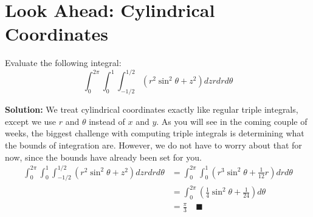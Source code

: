 \documentclass[letterpaper, 11pt]{article}
\begin{document}
\section{Look Ahead: Cylindrical Coordinates}
Evaluate the following integral:
\[ \int_0^{2 \pi} \int_0^1 \int_{-1/2}^{1/2} (r^2 \sin^2 \theta + z^2) dz r dr d\theta \]
\par \textbf{Solution:} We treat cylindrical coordinates exactly like regular triple integrals, except we use $r$ and $\theta$ instead of $x$ and $y$. As you will see in the coming couple of weeks, the biggest challenge with computing triple integrals is determining what the bounds of integration are. However, we do not have to worry about that for now, since the bounds have already been set for you.
\begin{align*}
\int_0^{2 \pi} \int_0^1 \int_{-1/2}^{1/2} (r^2 \sin^2 \theta + z^2) dz r dr d\theta &= \int_0^{2 \pi} \int_0^1 (r^3 \sin^2 \theta + \frac{1}{12}r)dr d\theta \\
&= \int_0^{2 \pi} \left( \frac{1}{4}\sin^2 \theta + \frac{1}{24}\right) d\theta\\
&= \frac{\pi}{3} \quad\blacksquare
\end{align*}
\end{document}
